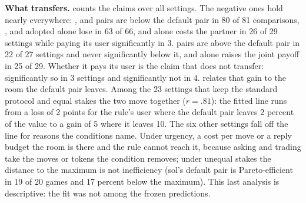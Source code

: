 \textbf{What transfers.}  counts the claims over all settings. The negative ones hold nearly everywhere: \competing, \compromising{} and \avoiding{} pairs are below the default pair in 80 of 81 comparisons, \avoiding, \accommodating{} and \compromising{} adopted alone lose in 63 of 66, and \competing{} alone costs the partner in 26 of 29 settings while paying its user significantly in 3. \collaborating{} pairs are above the default pair in 22 of 27 settings and never significantly below it, and \collaborating{} alone raises the joint payoff in 25 of 29. Whether it pays its user is the claim that does not transfer: significantly so in 3 settings and significantly not in 4.  relates that gain to the room the default pair leaves. Among the 23 settings that keep the standard protocol and equal stakes the two move together ($r = .81$): the fitted line runs from a loss of 2 points for the rule's user where the default pair leaves 2 percent of the value to a gain of 5 where it leaves 10. The six other settings fall off the line for reasons the conditions name. Under urgency, a cost per move or a reply budget the room is there and the rule cannot reach it, because asking and trading take the moves or tokens the condition removes; under unequal stakes the distance to the maximum is not inefficiency (sol's default pair is Pareto-efficient in 19 of 20 games and 17 percent below the maximum). This last analysis is descriptive: the fit was not among the frozen predictions.

